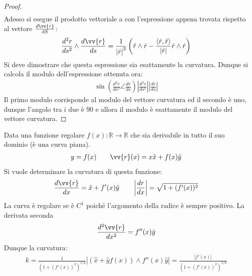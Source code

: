 \documentclass[a4paper, oneside]{article}
\begin{document}
\begin{proof}
\begin{gather*}
    \end{gather*}
    Adesso si esegue il prodotto vettoriale a con l'espressione appena trovata
    rispetto al vettore $\frac{d\vv{r} }{dS}$:
    \begin{gather*}
        \frac{d^{2}r}{ds^{2}} \wedge \frac{d\vv{r} }{ds} = \frac{1}{\left| \dot{r}  \right|^{3} }\left(\ddot{r} \wedge \dot{r}  - \frac{\left< \dot{r}, \ddot{r}   \right>}{\left| \dot{r}  \right| } \dot{r} \wedge \dot{r}   \right)
    \end{gather*}
    Si deve dimostrare che questa espressione sia esattamente la curvatura. Dunque si calcola il modulo 
    dell'espressione ottenuta ora:
    \begin{gather*}
        \sin\left(\frac{d^{2}r}{ds^{2}} \angle \frac{dr}{ds}\right) \left| \frac{d^{2}r}{ds^{2}} \right| \left| \frac{dr}{ds} \right|  
    \end{gather*}
    Il primo modulo corrisponde al modulo del vettore curvatura ed il secondo è uno, dunque l'angolo tra i due è
    90 e allora il modulo è esattamente il modulo del vettore curvatura.
\end{proof}

\begin{example}
    Data una funzione regolare $f(x)  : \mathbb{R} \to \mathbb{R}$ che sia derivabile 
    in tutto il suo dominio (è una curva piana).
    \begin{gather*}
        y = f(x) \qquad \vv{r}(x) = x\hat{x} + f(x) \hat{y}   
    \end{gather*}
    Si vuole determinare la curvatura di questa funzione:
    \begin{gather*}
        \frac{d\vv{r} }{dx} = \hat{x} + f'(x) \hat{y} \qquad \left| \frac{dr}{dx} \right| = \sqrt{1 + (f'(x))^{2}}    
    \end{gather*}
    La curva è regolare se è $C^{1}$ poiché l'argomento della radice è sempre positivo. La derivata seconda
    \begin{gather*}
        \frac{d^{2}\vv{r} }{dx^{2}} = f''(x)\hat{y} 
    \end{gather*} 
    Dunque la curvatura:
    \begin{gather*}
        k = \frac{1}{(1 + (f'(x))^{2})^{1/2}} \left| (\hat{x} + \hat{y}f(x)   ) \wedge   f''(x) \hat{y} \right|  = \frac{\left| f'(x) \right| }{(1 + (f'(x))^{2})^{1/2}}
    \end{gather*}
\end{example}
\end{document}
